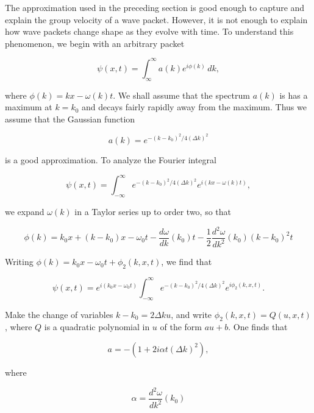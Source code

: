The approximation used in the preceding section is good enough to capture and explain the group velocity of a wave packet.  However, it is not enough to explain how wave packets change shape as they evolve with time.  To understand this phenomenon, we begin with  an arbitrary packet

\begin{equation}
\psi(x,t) = \int_{\infty}^\infty a(k) e^{i\phi(k)}\,dk,
\end{equation}

where $\phi(k) = kx - \omega(k)t$.  We shall assume that the spectrum $a(k)$ is has a maximum at $k = k_0$ and decays fairly rapidly away from the maximum.  Thus we assume that the Gaussian function

\begin{equation}
a(k) = e^{ -(k-k_0)^2/ 4(\Delta k)^2}
\end{equation}

is a good approximation.  To analyze the Fourier integral

\begin{equation}
\psi(x,t) = \int_{-\infty}^{\infty} e^{ -(k-k_0)^2/ 4(\Delta k)^2} e^{i(kx - \omega(k) t)},
\end{equation}

we expand $\omega(k)$ in a Taylor series up to order two, so that

\begin{equation}
\phi(k) = k_0x + (k - k_0)x - \omega_0t - \frac{d\omega}{dk}(k_0) t- \frac{1}{2}\frac{ d^2\omega }{ dk^2 }(k_0)( k - k_0)^2 t
\end{equation}

Writing $\phi(k) = k_0x - \omega_0t + \phi_2(k,x,t)$, we find that

\begin{equation}
\psi(x,t) = e^{i(k_0x - \omega_0 t)} \int_{-\infty}^{\infty} e^{ -(k-k_0)^2/ 4(\Delta k)^2} e^{i\phi_2(k,x,t)}.
\end{equation}

Make the change of variables $k - k_0 = 2\Delta k u$, and write $\phi_2(k,x,t) = Q(u,x,t)$, where $Q$ is a quadratic polynomial in $u$ of the form $au + b$. One finds that

\begin{equation}
  a = -(1 + 2i\alpha t  (\Delta k)^2),
\end{equation}

where

\begin{equation}
\alpha = \frac{ d^2\omega }{ dk^2 }(k_0)
\end{equation}


